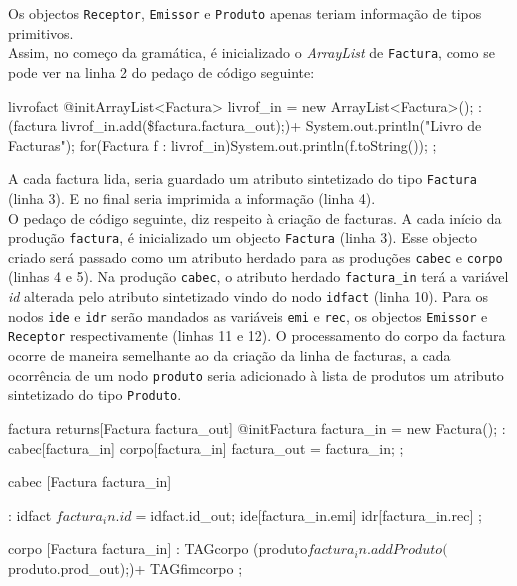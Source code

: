 \documentclass[11pt,a4paper]{article}
\begin{document}
Os objectos \texttt{Receptor}, \texttt{Emissor} e \texttt{Produto} apenas teriam informação de tipos primitivos. \\

Assim, no começo da gramática, é inicializado o \emph{ArrayList} de \texttt{Factura}, como se pode ver na linha 2 do pedaço de código seguinte:\\

\begin{code_txt}
livrofact 
@init{ArrayList<Factura> livrof_in = new ArrayList<Factura>();}
	:	(factura {livrof_in.add(\$factura.factura_out);})+ {System.out.println("Livro de Facturas\n"); 
						for(Factura f : livrof_in){System.out.println(f.toString());}}
	;
\end{code_txt}

A cada factura lida, seria guardado um atributo sintetizado do tipo \texttt{Factura} (linha 3). E no final seria imprimida a informação (linha 4).\\

O pedaço de código seguinte, diz respeito à criação de facturas. A cada início da produção \texttt{factura}, é inicializado um objecto \texttt{Factura} 
(linha 3). Esse objecto criado será passado como um atributo herdado para as produções \texttt{cabec} e \texttt{corpo} (linhas 4 e 5). Na produção
 \texttt{cabec}, o atributo herdado \texttt{factura\_in} terá a variável \emph{id} alterada pelo atributo sintetizado vindo do nodo \texttt{idfact} (linha 10).
 Para os nodos \texttt{ide} e \texttt{idr} serão mandados as variáveis \texttt{emi} e \texttt{rec}, os objectos \texttt{Emissor} e \texttt{Receptor} 
respectivamente (linhas 11 e 12). O processamento do corpo da factura ocorre de maneira semelhante ao da criação da linha de facturas, a 
cada ocorrência de um nodo \texttt{produto} seria adicionado à lista de produtos um atributo sintetizado do tipo \texttt{Produto}.

\begin{code_txt}
 factura 
returns[Factura factura_out]
@init{Factura factura_in = new Factura();}
	:	cabec[factura_in] {  }
		corpo[factura_in] { factura_out = factura_in; }
	;
	
cabec [Factura factura_in]

	:	idfact {$factura_in.id = $idfact.id_out;}
		ide[factura_in.emi]
		idr[factura_in.rec]
	;
	
corpo [Factura factura_in]	
	:	TAGcorpo
		(produto{$factura_in.addProduto($produto.prod_out);})+
		TAGfimcorpo
	;
\end{code_txt}
\end{document}
